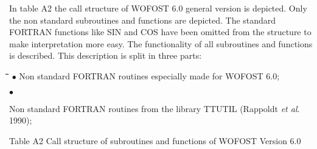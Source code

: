 \documentclass[11pt]{article}
\begin{document}
In table A2 the call structure of WOFOST 6.0 general version is depicted. Only the non
standard subroutines and functions are depicted. The standard FOR\-TRAN functions like
SIN and COS have been omitted from the structure to make interpre\-tation more easy. The
functionality of all subroutines and functions is described. This description is split in three
parts:\nwln
\begin{tabbing}
\hspace{1.27cm}\=\hspace{1.27cm}\=\hspace{1.27cm}\=\hspace{1.27cm}\=%
\hspace{1.27cm}\=\hspace{1.27cm}\=\hspace{1.27cm}\=\hspace{1.27cm}\=%
\hspace{1.27cm}\=\hspace{1.27cm}\=\kill
$\bullet$\> Non standard FORTRAN routines especially made for WOFOST 6.0;
\end{tabbing}
$\bullet$ 
\testlastline

\begin{indenting}{1.27cm}
Non standard FORTRAN routines from the library TTUTIL (Rappoldt {\it et al\/}.
1990);
\end{indenting}

\bigskip
Table A2 Call structure of subroutines and functions of WOFOST Version 6.0
\end{document}
